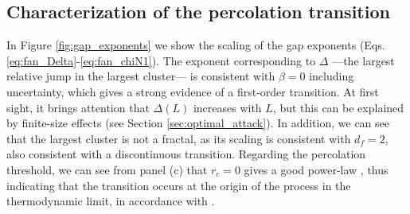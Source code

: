 \documentclass{article}
\begin{document}









\subsection{Characterization of the percolation transition}

In Figure \ref{fig:gap_exponents} we show the scaling of the gap exponents (Eqs. \ref{eq:fan_Delta}-\ref{eq:fan_chiN1}). The exponent corresponding to $\Delta$ ---the largest relative jump in the largest cluster--- is consistent with $\beta = 0$ including uncertainty, which gives a strong evidence of a first-order transition. At first sight, it brings attention that $\Delta(L)$ increases with $L$, but this can be explained by finite-size effects (see Section \ref{sec:optimal_attack}). In addition, we can see that the largest cluster is not a fractal, as its scaling is consistent with $d_f = 2$, also consistent with a discontinuous transition. Regarding the percolation threshold, we can see from panel (c) that $r_c = 0$ gives a good power-law , thus indicating that the transition occurs at the origin of the process in the thermodynamic limit, in accordance with \cite{Norrenbrock2016FragmentationAttacks}.
\end{document}
